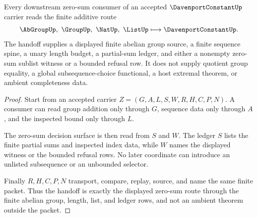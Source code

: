 \begin{theorem}
\label{thm:davenport-constant-zero-sum-handoff}
Every downstream zero-sum consumer of an accepted $\DavenportConstantUp$ carrier reads the finite additive route
$$
\AbGroupUp,\ \GroupUp,\ \NatUp,\ \ListUp \longmapsto \DavenportConstantUp .
$$
The handoff supplies a displayed finite abelian group source, a finite sequence spine, a unary length budget, a partial-sum ledger, and either a nonempty zero-sum sublist witness or a bounded refusal row. It does not supply quotient group equality, a global subsequence-choice functional, a host extremal theorem, or ambient completeness data.
\end{theorem}
\begin{proof}
Start from an accepted carrier $Z=(G,A,L,S,W,R,H,C,P,N)$. A consumer can read group addition only through $G$, sequence data only through $A$, and the inspected bound only through $L$.

The zero-sum decision surface is then read from $S$ and $W$. The ledger $S$ lists the finite partial sums and inspected index data, while $W$ names the displayed witness or the bounded refusal rows. No later coordinate can introduce an unlisted subsequence or an unbounded selector.

Finally $R,H,C,P,N$ transport, compare, replay, source, and name the same finite packet. Thus the handoff is exactly the displayed zero-sum route through the finite abelian group, length, list, and ledger rows, and not an ambient theorem outside the packet.
\end{proof}




